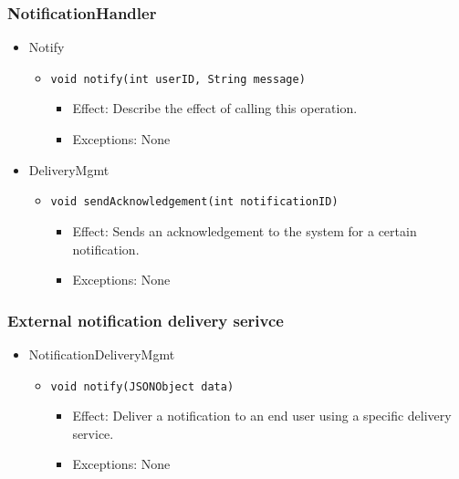     \subsubsection{NotificationHandler}
        \begin{itemize}
            \item Notify
            \begin{itemize}
                \item \texttt{void notify(int userID, String message)}
                \begin{itemize}
                    \item Effect: Describe the effect of calling this operation.
                    \item Exceptions: None
                \end{itemize}
            \end{itemize}

            \item DeliveryMgmt
            \begin{itemize}
                \item \texttt{void sendAcknowledgement(int notificationID)}
                \begin{itemize}
                    \item Effect: Sends an acknowledgement to the system for a certain notification.
                    \item Exceptions: None
                \end{itemize}
            \end{itemize}
        \end{itemize}

    \subsubsection{External notification delivery serivce}
        \begin{itemize}
            \item NotificationDeliveryMgmt
            \begin{itemize}
                \item \texttt{void notify(JSONObject data)}
                \begin{itemize}
                    \item Effect: Deliver a notification to an end user using a specific delivery service.
                    \item Exceptions: None
                \end{itemize}
            \end{itemize}
        \end{itemize}

